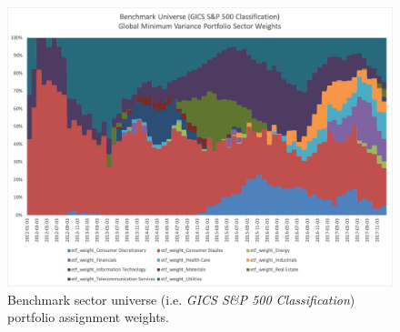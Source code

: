 \documentclass[../main.tex]{subfiles}
\begin{document}
\newpage
\begin{figure}
    \centering
    \includegraphics[width=\linewidth]{images/sp500_sector_assignments.png}
    \caption{Benchmark sector universe (i.e. \textit{GICS S\&P 500 Classification}) portfolio assignment weights.}
    \label{fig:appendix_weights:benchmark}
\end{figure}
\end{document}
